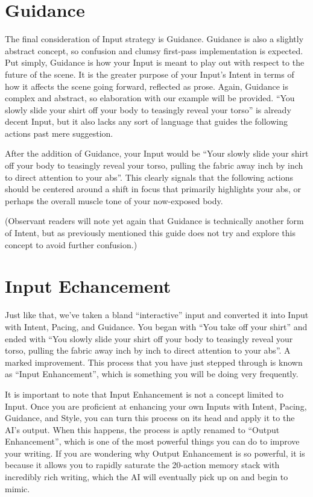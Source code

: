\documentclass[Source-main.tex]{subfiles}
\begin{document}
\section{Guidance}

The final consideration of Input strategy is Guidance.
Guidance is also a slightly abstract concept, so confusion and clumsy first-pass implementation is expected.
Put simply, Guidance is how your Input is meant to play out with respect to the future of the scene.
It is the greater purpose of your Input’s Intent in terms of how it affects the scene going forward, reflected as prose.
Again, Guidance is complex and abstract, so elaboration with our example will be provided.
“You slowly slide your shirt off your body to teasingly reveal your torso” is already decent Input, but it also lacks any sort of language that guides the following actions past mere suggestion.

After the addition of Guidance, your Input would be “Your slowly slide your shirt off your body to teasingly reveal your torso, pulling the fabric away inch by inch to direct attention to your abs”.
This clearly signals that the following actions should be centered around a shift in focus that primarily highlights your abs, or perhaps the overall muscle tone of your now-exposed body.

(Observant readers will note yet again that Guidance is technically another form of Intent, but as previously mentioned this guide does not try and explore this concept to avoid further confusion.)

\section{Input Echancement}

Just like that, we’ve taken a bland “interactive” input and converted it into Input with Intent, Pacing, and Guidance.
You began with “You take off your shirt” and ended with “You slowly slide your shirt off your body to teasingly reveal your torso, pulling the fabric away inch by inch to direct attention to your abs”.
A marked improvement.
This process that you have just stepped through is known as “Input Enhancement”, which is something you will be doing very frequently.

It is important to note that Input Enhancement is not a concept limited to Input.
Once you are proficient at enhancing your own Inputs with Intent, Pacing, Guidance, and Style, you can turn this process on its head and apply it to the AI’s output.
When this happens, the process is aptly renamed to “Output Enhancement”, which is one of the most powerful things you can do to improve your writing.
If you are wondering why Output Enhancement is so powerful, it is because it allows you to rapidly saturate the 20-action memory stack with incredibly rich writing, which the AI will eventually pick up on and begin to mimic.
\end{document}
